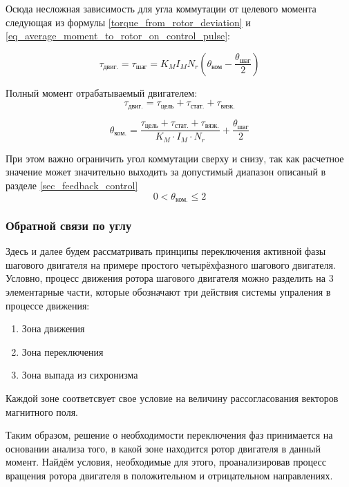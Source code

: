 Осюда несложная зависимость для угла коммутации от целевого момента следующая из
формулы \ref{torque_from_rotor_deviation}
и \ref{eq_average_moment_to_rotor_on_control_pulse}:

$$
    \tau_\textit{двиг.} =
        \tau_{\textit{шаг}} =
            K_{M} I_{M} N_{r} ( \theta_{\textit{ком}}
                                - \frac{ \theta_{\textit{шаг}} }{ 2 }
            )
$$

Полный момент отрабатываемый двигателем:
\begin{equation}
    \label{eq_motor_torque}
    \tau_\textit{двиг.} =
        \tau_\textit{цель}
        + \tau_\textit{стат.}
        + \tau_\textit{вязк.}
\end{equation}

\begin{equation}
    \label{eq_commutation_angle}
    \theta_{\textit{ком.}} =
    \frac{ \tau_\textit{цель} + \tau_\textit{стат.} + \tau_\textit{вязк.} }
         { K_{M} \cdot I_{M} \cdot N_{r} }
    + \frac{ \theta_{\textit{шаг}} }{ 2 }
\end{equation}

При этом важно ограничить угол коммутации сверху и снизу, так как расчетное
значение может значительно выходить за допустимый диапазон описаный в разделе
\ref{sec_feedback_control}
$$
    0 < \theta_{\textit{ком.}} \leq 2
$$

\clearpage
\subsubsection{Обратной связи по углу}
\label{fedback_control_algo}
Здесь и далее будем рассматривать принципы переключения активной фазы шагового
двигателя на примере простого четырёхфазного шагового двигателя.
Условно, процесс движения ротора шагового двигателя можно разделить на 3
элементарные части, которые обозначают три действия системы упраления в процессе
движения:

\begin{enumerate}
    \item Зона движения
    \item Зона переключения
    \item Зона выпада из сихронизма
\end{enumerate}

Каждой зоне соответсвует свое условие на величину рассогласования векторов
магнитного поля.

Таким образом, решение о необходимости переключения фаз принимается на основании
анализа того, в какой зоне находится ротор двигателя в данный момент. Найдём
условия, необходимые для этого, проанализировав процесс вращения ротора
двигателя в положительном и отрицательном направлениях.

